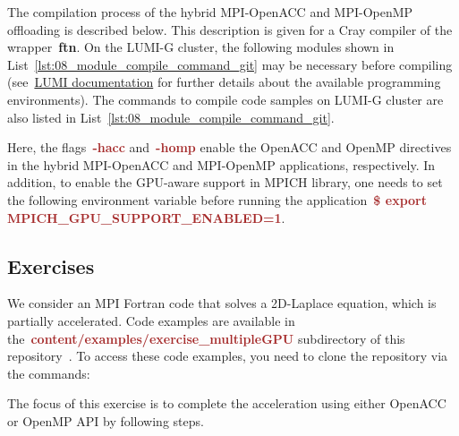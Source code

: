 \par
The compilation process of the hybrid MPI-OpenACC and MPI-OpenMP offloading is described below.
This description is given for a Cray compiler of the wrapper~\textbf{ftn}.
On the LUMI-G cluster, the following modules shown in List~\ref{lst:08_module_compile_command_git} may be necessary before compiling (see~\href{https://docs.lumi-supercomputer.eu/development/compiling/prgenv/}{LUMI documentation} for further details about the available programming environments).
The commands to compile code samples on LUMI-G cluster are also listed in List~\ref{lst:08_module_compile_command_git}.





\par
Here, the flags~\textbf{\textcolor{brown}{-hacc}} and~\textbf{\textcolor{brown}{-homp}} enable the OpenACC and OpenMP directives in the hybrid MPI-OpenACC and MPI-OpenMP applications, respectively.
In addition, to enable the GPU-aware support in MPICH library, one needs to set the following environment variable before running the application~\textbf{\textcolor{brown}{\$ export MPICH\_GPU\_SUPPORT\_ENABLED=1}}.




\subsection{Exercises}


\par
We consider an MPI Fortran code that solves a 2D-Laplace equation, which is partially accelerated.
Code examples are available in the~\textbf{\textcolor{brown}{content/examples/exercise\_multipleGPU}} subdirectory of this repository~\cite{gpu-programming-examples}.
To access these code examples, you need to clone the repository via the commands:

The focus of this exercise is to complete the acceleration using either OpenACC or OpenMP API by following steps.


